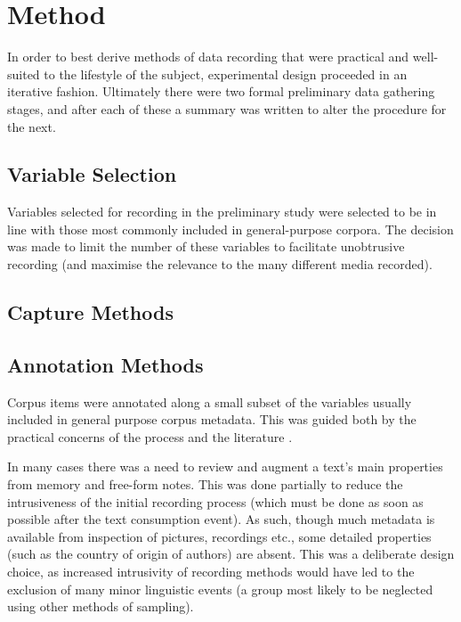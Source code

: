 \section{Method}
In order to best derive methods of data recording that were practical and well-suited to the lifestyle of the subject, experimental design proceeded in an iterative fashion.  Ultimately there were two formal preliminary data gathering stages, and after each of these a summary was written to alter the procedure for the next.






\subsection{Variable Selection}
Variables selected for recording in the preliminary study were selected to be in line with those most commonly included in general-purpose corpora.  The decision was made to limit the number of these variables to facilitate unobtrusive recording (and maximise the relevance to the many different media recorded).





\subsection{Capture Methods}



\subsection{Annotation Methods}
Corpus items were annotated along a small subset of the variables usually included in general purpose corpus metadata.  This was guided both by the practical concerns of the process and the literature %
.

In many cases there was a need to review and augment a text's main properties from memory and free-form notes.  This was done partially to reduce the intrusiveness of the initial recording process (which must be done as soon as possible after the text consumption event).  As such, though much metadata is available from inspection of pictures, recordings etc., some detailed properties (such as the country of origin of authors) are absent.  This was a deliberate design choice, as increased intrusivity of recording methods would have led to the exclusion of many minor linguistic events (a group most likely to be neglected using other methods of sampling).


